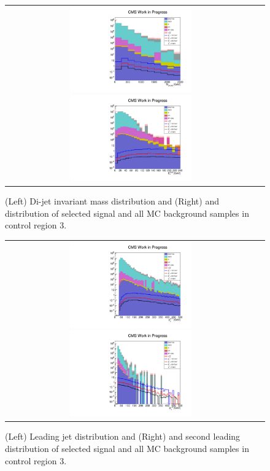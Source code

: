 \begin{figure}[tbh!]
	\centering
	\begin{tabular}{cc}
		\includegraphics[width=0.5\textwidth]{analysis/pics/h_dijetinvariantmass_Tau2LooseIsoInclusive.pdf}
		\includegraphics[width=0.5\textwidth]{analysis/pics/h_met_Tau2LooseIsoInclusive.pdf}
	\end{tabular}
	\caption{(Left) Di-jet invariant mass distribution and (Right) and \met distribution of selected signal and all MC background samples in control region 3.}
	\label{fig::crplots1_Tau2LooseIsoInclusive_13tev}
\end{figure}

\begin{figure}[tbh!]
	\centering
	\begin{tabular}{cc}
		\includegraphics[width=0.5\textwidth]{analysis/pics/h_jet1pt_Tau2LooseIsoInclusive.pdf}
		\includegraphics[width=0.5\textwidth]{analysis/pics/h_tau2pt_Tau2LooseIsoInclusive.pdf}
	\end{tabular}
	\caption{(Left) Leading jet \pt distribution and (Right) and second leading \hadtau \pt distribution of selected signal and all MC background samples in control region 3.}
	\label{fig::crplots2_Tau2LooseIsoInclusive_13tev}
\end{figure}

